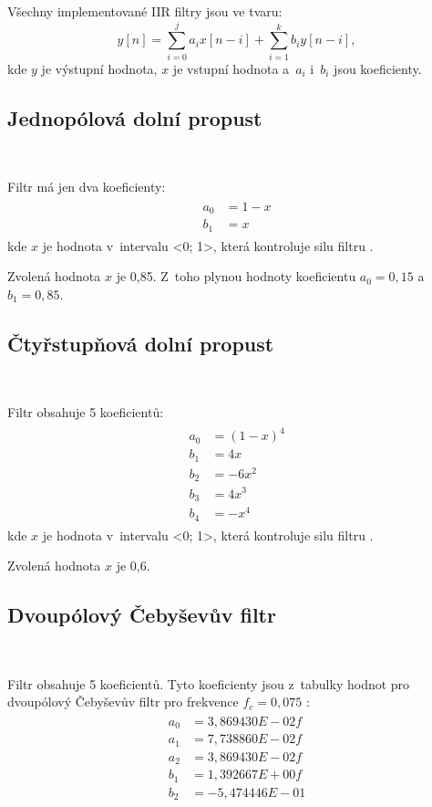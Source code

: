 Všechny implementované IIR filtry jsou ve tvaru:
\begin{equation}
y[n] = \sum_{i = 0}^{j}a_{i}x[n - i] + \sum_{i = 1}^{k}b_{i}y[n - i],
\end{equation}
kde $y$ je výstupní hodnota, $x$ je vstupní hodnota a~$a_i$ i~$b_i$ jsou
koeficienty.

\subsection{Jednopólová dolní propust}\

Filtr má jen dva koeficienty:
\begin{align}
\begin{split}
a_0 &= 1 - x \\
b_1 &= x
\end{split}
\end{align}
kde $x$ je hodnota v~intervalu <0; 1>, která kontroluje silu filtru \cite{Filters}.

Zvolená hodnota $x$ je 0,85. Z~toho plynou hodnoty koeficientu $a_0 = 0,15$ 
a~$b_1 = 0,85$.

\subsection{Čtyřstupňová dolní propust}\

Filtr obsahuje 5 koeficientů:
\begin{align}
\begin{split}
a_0 &= (1 - x)^4 \\
b_1 &= 4x \\
b_2 &= -6x^2 \\
b_3 &= 4x^3 \\
b_4 &= -x^4
\end{split}
\end{align}
kde $x$ je hodnota v~intervalu <0; 1>, která kontroluje silu filtru \cite{Filters}.

Zvolená hodnota $x$ je 0,6.

\subsection{Dvoupólový Čebyševův filtr}\

Filtr obsahuje 5 koeficientů. Tyto koeficienty jsou z~tabulky hodnot pro dvoupólový
Čebyševův filtr pro frekvence $f_c = 0,075$ \cite{Filters}:
\begin{align}
\begin{split}
a_0 &= 3,869430E-02f \\
a_1 &= 7,738860E-02f \\
a_2 &= 3,869430E-02f \\
b_1 &= 1,392667E+00f \\
b_2 &= -5,474446E-01 \\
\end{split}
\end{align}

